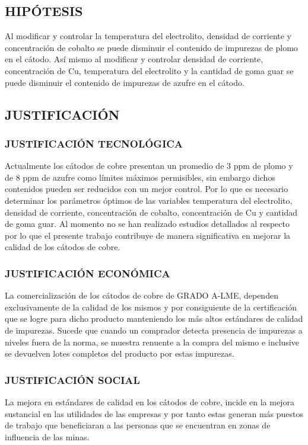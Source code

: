 \subsection{HIP\'OTESIS}
Al modificar y controlar la temperatura del electrolito, densidad de corriente y concentraci\'on de cobalto  se puede disminuir el contenido de impurezas de plomo en el c\'atodo.
As\'i mismo al modificar y controlar densidad de corriente, concentraci\'on de Cu, temperatura del electrolito y la cantidad de goma guar se puede disminuir el contenido de impurezas de azufre en el c\'atodo.

\subsection{JUSTIFICACI\'ON}

\subsubsection{JUSTIFICACI\'ON TECNOL\'OGICA}
Actualmente los c\'atodos de cobre presentan un promedio de 3 ppm de plomo y de 8 ppm de azufre como límites m\'aximos permisibles, sin embargo dichos contenidos pueden ser reducidos  con un mejor control. Por lo que es necesario determinar los par\'ametros \'optimos de las variables temperatura del electrolito, densidad de corriente, concentraci\'on de cobalto, concentraci\'on de Cu y cantidad de goma guar. Al momento no se han realizado estudios detallados al respecto por lo que el presente trabajo contribuye de manera significativa en mejorar la calidad de los c\'atodos de cobre.

\subsubsection{JUSTIFICACI\'ON ECON\'OMICA}
La comercializaci\'on de los c\'atodos de cobre de GRADO A-LME, dependen exclusivamente de la calidad de los mismos y por consiguiente de la certificaci\'on que se logre para dicho producto manteniendo los m\'as altos est\'andares de calidad de impurezas. Sucede que cuando un comprador detecta presencia de impurezas a niveles fuera de la norma, se muestra renuente a la compra del mismo e inclusive se devuelven lotes completos del producto por estas impurezas.

\subsubsection{JUSTIFICACI\'ON SOCIAL}
La mejora en est\'andares de calidad en los c\'atodos de cobre, incide en la mejora sustancial en las utilidades de las empresas y por tanto estas generan m\'as puestos de trabajo que beneficiaran a las personas que se encuentran en zonas de influencia de las minas. 

